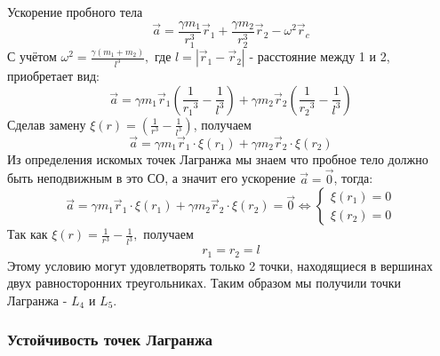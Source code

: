 \documentclass[a4paper,12pt]{article}
\begin{document}
Ускорение пробного тела
$$ \vec{a} = \frac{\gamma m_1}{r_1^3} \vec{r}_1 + \frac{\gamma m_2}{r_2^3} \vec{r}_2 - \omega^2 \vec{r}_{c}  $$
С учётом $ \omega^2 = \frac{\gamma (m_1 + m_2)}{l^3}, $ где $ l = \left|\vec{r}_1 - \vec{r}_2\right| $ - расстояние между 1 и 2, приобретает вид:
$$ \vec{a} = \gamma m_1 \vec{r}_1 \left(\frac{1}{{r_1}^3} - \frac{1}{l^3}\right) + \gamma m_2 \vec{r}_2 \left(\frac{1}{{r_2}^3} - \frac{1}{l^3}\right) $$
Сделав замену $\xi(r) = \left(\frac{1}{r^3} - \frac{1}{l^3}\right)$, получаем 
$$ \vec{a} = \gamma m_1 \vec{r}_1 \cdot \xi(r_1) + \gamma m_2 \vec{r}_2 \cdot \xi(r_2)  $$
Из определения искомых точек Лагранжа мы знаем что пробное тело должно быть
неподвижным в это СО, а значит его ускорение $\vec{a} = \vec{0}$, тогда:
$$ \vec{a} = \gamma m_1 \vec{r}_1 \cdot \xi(r_1) + \gamma m_2 \vec{r}_2 \cdot \xi(r_2) = \vec{0} \Longleftrightarrow \begin{cases} \xi(r_1) = 0 \\ \xi(r_2) = 0 \end{cases} $$
Так как $\xi(r) = \frac{1}{r^3} - \frac{1}{l^3},$ получаем
$$ r_1 = r_2 = l $$
Этому условию могут удовлетворять только 2 точки, находящиеся в вершинах двух равносторонних треугольниках.
Таким образом мы получили точки Лагранжа - $L_4$ и $L_5$.
                                                                                                  
\subsubsection{Устойчивость точек Лагранжа}
\end{document}
